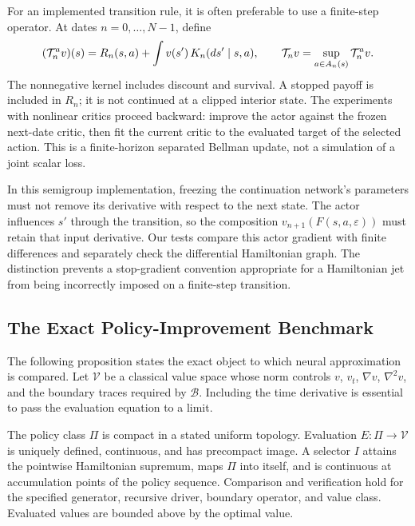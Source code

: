 For an implemented transition rule, it is often preferable to use a finite-step operator. At dates $n=0,\ldots,N-1$, define
\begin{equation}
 (\mathcal T_n^a v)(s)=R_n(s,a)+\int v(s')\,K_n(ds'\mid s,a),
 \qquad \mathcal T_n v=\sup_{a\in A_n(s)}\mathcal T_n^a v.
 \label{eq:finite_operator}
\end{equation}
The nonnegative kernel includes discount and survival. A stopped payoff is included in $R_n$; it is not continued at a clipped interior state. The experiments with nonlinear critics proceed backward: improve the actor against the frozen next-date critic, then fit the current critic to the evaluated target of the selected action. This is a finite-horizon separated Bellman update, not a simulation of a joint scalar loss.

In this semigroup implementation, freezing the continuation network's parameters must not remove its derivative with respect to the next state. The actor influences $s'$ through the transition, so the composition $v_{n+1}(F(s,a,\varepsilon))$ must retain that input derivative. Our tests compare this actor gradient with finite differences and separately check the differential Hamiltonian graph. The distinction prevents a stop-gradient convention appropriate for a Hamiltonian jet from being incorrectly imposed on a finite-step transition.

\subsection{The Exact Policy-Improvement Benchmark}
The following proposition states the exact object to which neural approximation is compared. Let $\mathcal V$ be a classical value space whose norm controls $v$, $v_t$, $\nabla v$, $\nabla^2v$, and the boundary traces required by $\mathcal B$. Including the time derivative is essential to pass the evaluation equation to a limit.

\begin{assumption}
\label{ass:exact}
The policy class $\Pi$ is compact in a stated uniform topology. Evaluation $E:\Pi\to\mathcal V$ is uniquely defined, continuous, and has precompact image. A selector $I$ attains the pointwise Hamiltonian supremum, maps $\Pi$ into itself, and is continuous at accumulation points of the policy sequence. Comparison and verification hold for the specified generator, recursive driver, boundary operator, and value class. Evaluated values are bounded above by the optimal value.
\end{assumption}

